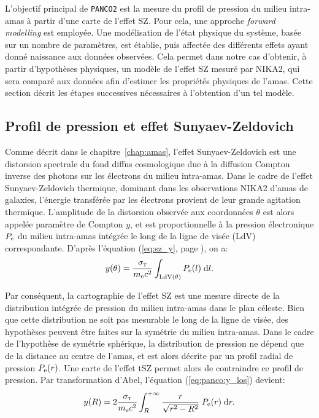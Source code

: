 L'objectif principal de \texttt{PANCO2} est la mesure du profil de pression du milieu intra-amas à partir d'une carte de l'effet SZ.
Pour cela, une approche \textit{forward modelling} est employée.
Une modélisation de l'état physique du système, basée sur un nombre de paramètres, est établie, puis affectée des différents effets ayant donné naissance aux données observées.
Cela permet dans notre cas d'obtenir, à partir d'hypothèses physiques, un modèle de l'effet SZ mesuré par NIKA2, qui sera comparé aux données afin d'estimer les propriétés physiques de l'amas.
Cette section décrit les étapes successives nécessaires à l'obtention d'un tel modèle.

\subsection{Profil de pression et effet Sunyaev-Zeldovich} \label{sec:panco:p_prof}

Comme décrit dans le chapitre~\ref{chap:amas}, l'effet Sunyaev-Zeldovich est une distorsion spectrale du fond diffus cosmologique due à la diffusion Compton inverse des photons sur les électrons du milieu intra-amas.
Dans le cadre de l'effet Sunyaev-Zeldovich thermique, dominant dans les observations NIKA2 d'amas de galaxies, l'énergie transférée par les électrons provient de leur grande agitation thermique.
L'amplitude de la distorsion observée aux coordonnées $\theta$ est alors appelée paramètre de Compton $y$, et est proportionnelle à la pression électronique $P_{\rm e}$ du milieu intra-amas intégrée le long de la ligne de visée (LdV) correspondante.
D'après l'équation (\ref{eq:sz_y}, page \pageref{eq:sz_y}), on a:
\begin{equation}
    \label{eq:panco:y_los}
    y(\theta) = \frac{\sigma_\textsc{t}}{m_{\rm e} c^2} \int_{\rm LdV(\theta)} P_{\rm e}(l) \; \mathrm{d} l .
\end{equation}

Par conséquent, la cartographie de l'effet SZ est une mesure directe de la distribution intégrée de pression du milieu intra-amas dans le plan céleste.
Bien que cette distribution ne soit pas mesurable le long de la ligne de visée, des hypothèses peuvent être faites sur la symétrie du milieu intra-amas.
Dans le cadre de l'hypothèse de symétrie sphérique, la distribution de pression ne dépend que de la distance au centre de l'amas, et est alors décrite par un profil radial de pression $P_{\rm e}(r)$.
Une carte de l'effet tSZ permet alors de contraindre ce profil de pression.
Par transformation d'Abel, l'équation (\ref{eq:panco:y_los}) devient:
\begin{equation}
    \label{eq:panco:y_abel}
    y(R) = 2\frac{\sigma_\textsc{t}}{m_{\rm e} c^2} \int_{R}^{+\infty} \frac{r}{\sqrt{r^2 - R^2}} \; P_{\rm e}(r) \; \mathrm{d} r .
\end{equation}

